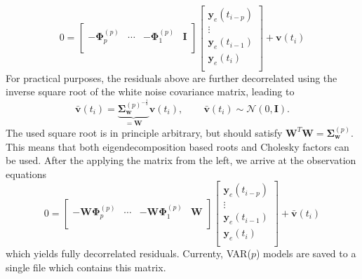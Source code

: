 \begin{equation}
  0 =
  \begin{bmatrix}
    -\mathbf{\Phi}^{(p)}_p & \cdots & -\mathbf{\Phi}^{(p)}_1 & \mathbf{I} \\
  \end{bmatrix}
  \begin{bmatrix}
    \mathbf{y}_e(t_{i-p}) \\
    \vdots \\
    \mathbf{y}_e(t_{i-1}) \\
    \mathbf{y}_e(t_i) \\
  \end{bmatrix}
  + \mathbf{v}(t_i)
\end{equation}
For practical purposes, the residuals above are further decorrelated using the
inverse square root of the white noise covariance matrix, leading to
\begin{equation}
  \bar{\mathbf{v}}(t_i) = \underbrace{\mathbf{\Sigma}^{(p)^{-\frac{1}{2}}}_\mathbf{w}}_{=\mathbf{W}}\mathbf{v}(t_i), \hspace{25pt}  \bar{\mathbf{v}}(t_i) \sim \mathcal{N}(0, \mathbf{I}).
\end{equation}
The used square root is in principle arbitrary, but should satisfy $\mathbf{W}^T\mathbf{W} = \mathbf{\Sigma}^{(p)}_\mathbf{w} $.
This means that both eigendecomposition based roots and Cholesky factors can be used.
After the applying the matrix from the left, we arrive at the observation equations
\begin{equation}
  0 =
  \begin{bmatrix}
    -\mathbf{W}\mathbf{\Phi}^{(p)}_p & \cdots & -\mathbf{W}\mathbf{\Phi}^{(p)}_1 & \mathbf{W} \\
  \end{bmatrix}
  \begin{bmatrix}
    \mathbf{y}_e(t_{i-p}) \\
    \vdots \\
    \mathbf{y}_e(t_{i-1}) \\
    \mathbf{y}_e(t_i) \\
  \end{bmatrix}
  + \bar{\mathbf{v}}(t_i)
\end{equation}
which yields fully decorrelated residuals.
Currenty, VAR($p$) models are saved to a single  file which contains this matrix.
